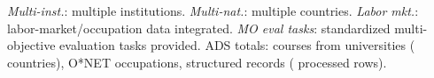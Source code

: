 \begin{table}[t]
{\raggedright\scriptsize
\textit{Multi-inst.}: multiple institutions.
\textit{Multi-nat.}: multiple countries.
\textit{Labor mkt.}: labor-market/occupation data integrated.
\textit{MO eval tasks}: standardized multi-objective evaluation tasks provided.
ADS totals: \NumCourses{} courses from \NumUniversities{} universities
(\NumCountries{} countries), \NumOccupations{} O*NET occupations,
\NumAttributeRecords{} structured records (\NumProcessedRows{} processed rows).
\par}
\end{table}
